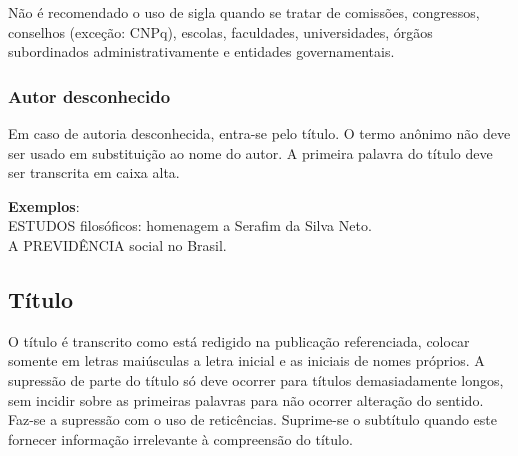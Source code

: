 Não é recomendado o uso de sigla quando se tratar de comissões, congressos, conselhos (exceção: CNPq), escolas, faculdades, universidades, órgãos subordinados administrativamente e entidades governamentais.


\subsubsection{Autor desconhecido}

Em caso de autoria desconhecida, entra-se pelo título. O termo anônimo não deve ser usado em substituição ao nome do autor. A primeira palavra do título deve ser transcrita em caixa alta.

\begin{exemplomanual}  
\textbf{Exemplos}:\\
ESTUDOS filosóficos: homenagem a Serafim da Silva Neto.\\
A PREVIDÊNCIA social no Brasil.
\end{exemplomanual}  


\subsection{Título}

O título é transcrito como está redigido na publicação referenciada, colocar somente em letras maiúsculas a letra inicial e as iniciais de nomes próprios. A supressão de parte do título só deve ocorrer para títulos demasiadamente longos, sem incidir sobre as primeiras palavras para não ocorrer alteração do sentido. Faz-se a supressão com o uso de reticências. Suprime-se o subtítulo quando este fornecer informação irrelevante à compreensão do título.

